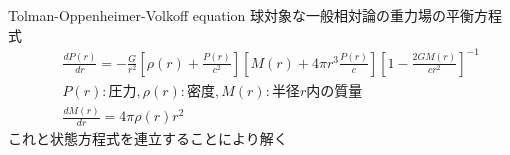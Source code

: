 \begin{frame}{Tolman-Oppenheimer-Volkoff equation}
  球対象な一般相対論の重力場の平衡方程式
  \begin{eqnarray*}
    && \frac{dP(r)}{dr}=-\frac{G}{r^2}\left[ \rho(r)+\frac{P(r)}{c^2} \right]\left[M(r)+4\pi r^3 \frac{P(r)}{c} \right] \left[ 1-\frac{2GM(r)}{cr^2} \right]^{-1}\\
    && P(r):\mbox{圧力}, \rho(r):\mbox{密度}, M(r):\mbox{半径}r\mbox{内の質量}\\
    && \frac{dM(r)}{dr}=4\pi \rho(r) r^2
  \end{eqnarray*}
  これと状態方程式を連立することにより解く
\end{frame}
